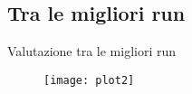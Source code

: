 \subsection{Tra le migliori run}
\begin{frame}{Valutazione tra le migliori run}
	\begin{figure}
	\texttt{[image: plot2]}
	\end{figure}
	
\end{frame}